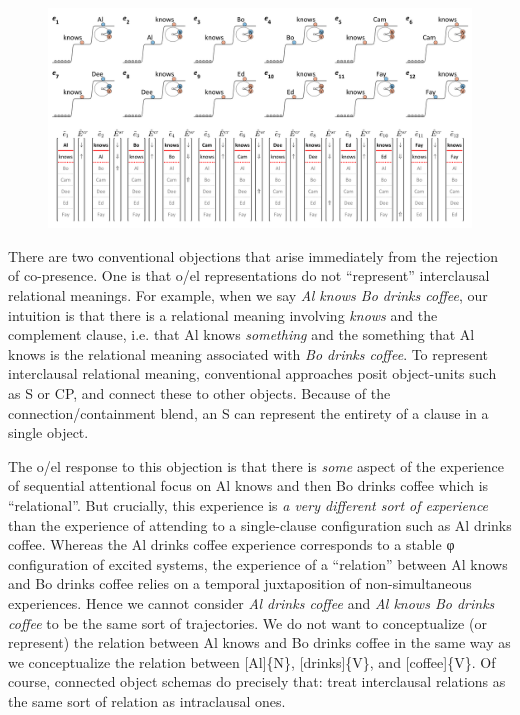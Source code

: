   
\begin{figure}
\includegraphics[width=\textwidth]{figures/Tilsen-img106.png}
\caption{\missingcaption}
\label{fig:5:2}
\end{figure}
 

  There are two conventional objections that arise immediately from the rejection of co-presence. One is that o/el representations do not “represent” interclausal relational meanings. For example, when we say \textit{Al knows Bo drinks coffee}, our intuition is that there is a relational meaning involving \textit{knows} and the complement clause, i.e. that Al knows \textit{something} and the something that Al knows is the relational meaning associated with \textit{Bo drinks coffee}. To represent interclausal relational meaning, conventional approaches posit object-units such as S or CP, and connect these to other objects. Because of the connection/containment blend, an S can represent the entirety of a clause in a single object. 

  The o/el response to this objection is that there is \textit{some} aspect of the experience of sequential attentional focus on {\textbar}Al knows{\textbar} and then {\textbar}Bo drinks coffee{\textbar} which is “relational”. But crucially, this experience is \textit{a very different sort of experience} than the experience of attending to a single-clause configuration such as {\textbar}Al drinks coffee{\textbar}. Whereas the {\textbar}Al drinks coffee{\textbar} experience corresponds to a stable φ configuration of excited systems, the experience of a “relation” between {\textbar}Al knows{\textbar} and {\textbar}Bo drinks coffee{\textbar} relies on a temporal juxtaposition of non-simultaneous experiences. Hence we cannot consider \textit{Al drinks coffee} and \textit{Al knows Bo drinks coffee} to be the same sort of trajectories. We do not want to conceptualize (or represent) the relation between {\textbar}Al knows{\textbar} and {\textbar}Bo drinks coffee{\textbar} in the same way as we conceptualize the relation between [Al]\{N\}, [drinks]\{V\}, and [coffee]\{V\}. Of course, connected object schemas do precisely that: treat interclausal relations as the same sort of relation as intraclausal ones.

